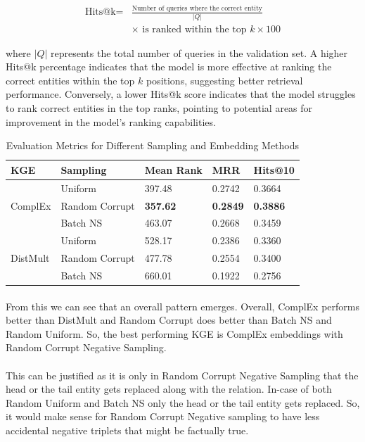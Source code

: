 \documentclass[12pt]{article}
\begin{document}
\begin{itemize}
\begin{align*}
\text{Hits@k} = & \frac{\text{Number of queries where the correct entity}}{|Q|} \\
& \times \text{ is ranked within the top } k \times 100
\end{align*}


where \( |Q| \) represents the total number of queries in the validation set. A higher Hits@k percentage indicates that the model is more effective at ranking the correct entities within the top \( k \) positions, suggesting better retrieval performance. Conversely, a lower Hits@k score indicates that the model struggles to rank correct entities in the top ranks, pointing to potential areas for improvement in the model's ranking capabilities.

\end{itemize}

\begin{table}[htbp]
\centering
\caption{Evaluation Metrics for Different Sampling and Embedding Methods}
\label{tab:evaluation_metrics}
\begin{tabular}{@{}lllll@{}}
\toprule
KGE & Sampling & Mean Rank & MRR & Hits@10 \\
\midrule
\multirow{3}{*}{ComplEx} & Uniform & 397.48 & 0.2742 & 0.3664 \\
 & Random Corrupt & \textbf{357.62} & \textbf{0.2849} & \textbf{0.3886} \\
 & Batch NS & 463.07 & 0.2668 & 0.3459 \\
\midrule
\multirow{3}{*}{DistMult} & Uniform & 528.17 & 0.2386 & 0.3360 \\
 & Random Corrupt & 477.78 & 0.2554 & 0.3400 \\
 & Batch NS & 660.01 & 0.1922 &  0.2756 \\
\bottomrule
\end{tabular}
\end{table}

\paragraph{}From this we can see that an overall pattern emerges. Overall, ComplEx performs better than DistMult and Random Corrupt does better than Batch NS and Random Uniform. So, the best performing KGE is ComplEx embeddings with Random Corrupt Negative Sampling. 

\paragraph{}This can be justified as it is only in Random Corrupt Negative Sampling that the head or the tail entity gets replaced along with the relation. In-case of both Random Uniform and Batch NS only the head or the tail entity gets replaced. So, it would make sense for Random Corrupt Negative sampling to have less accidental negative triplets that might be factually true. 
\end{document}
